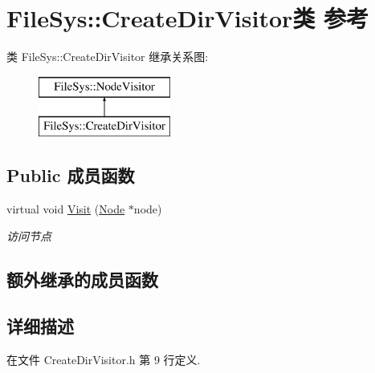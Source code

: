\hypertarget{class_file_sys_1_1_create_dir_visitor}{\section{File\-Sys\-:\-:Create\-Dir\-Visitor类 参考}
\label{class_file_sys_1_1_create_dir_visitor}
}
类 File\-Sys\-:\-:Create\-Dir\-Visitor 继承关系图\-:\begin{figure}[H]
\begin{center}
\leavevmode
\includegraphics[height=2.000000cm]{class_file_sys_1_1_create_dir_visitor}
\end{center}
\end{figure}
\subsection*{Public 成员函数}
\begin{DoxyCompactItemize}
\item 
virtual void \hyperlink{class_file_sys_1_1_create_dir_visitor_a02c79d46c769edbbcff38a59a97811ab}{Visit} (\hyperlink{class_file_sys_1_1_node}{Node} $\ast$node)
\begin{DoxyCompactList}\small\item\em 访问节点 \end{DoxyCompactList}\end{DoxyCompactItemize}
\subsection*{额外继承的成员函数}


\subsection{详细描述}


在文件 Create\-Dir\-Visitor.\-h 第 9 行定义.




